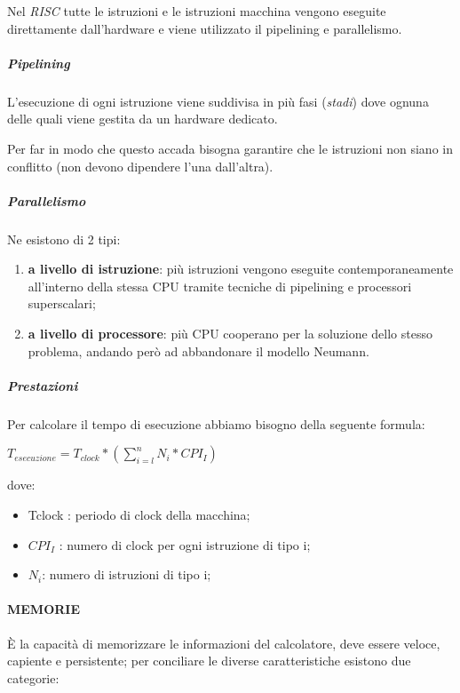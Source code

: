 Nel \emph{RISC} tutte le istruzioni e le istruzioni macchina vengono
eseguite direttamente dall'hardware e viene utilizzato il pipelining e
parallelismo.

\subparagraph{\texorpdfstring{\emph{Pipelining}}{Pipelining}}\label{pipelining}

L'esecuzione di ogni istruzione viene suddivisa in più fasi
(\emph{stadi}) dove ognuna delle quali viene gestita da un hardware
dedicato.

Per far in modo che questo accada bisogna garantire che le istruzioni
non siano in conflitto (non devono dipendere l'una dall'altra).

\subparagraph{\texorpdfstring{\emph{Parallelismo}}{Parallelismo}}\label{parallelismo}

Ne esistono di 2 tipi:

\begin{enumerate}
\def\labelenumi{\arabic{enumi}.}
\item
  \textbf{a livello di istruzione}: più istruzioni vengono eseguite
  contemporaneamente all'interno della stessa CPU tramite tecniche di
  pipelining e processori superscalari;
\item
  \textbf{a livello di processore}: più CPU cooperano per la soluzione
  dello stesso problema, andando però ad abbandonare il modello Neumann.
\end{enumerate}

\subparagraph{\texorpdfstring{\emph{Prestazioni}}{Prestazioni}}\label{prestazioni}

Per calcolare il tempo di esecuzione abbiamo bisogno della seguente
formula:

\(T_{esecuzione} = T_{clock}*(\sum_{i = l}^{n}N_{i}*CPI_{I})\)

dove:

\begin{itemize}
\item
  Tclock : periodo di clock della macchina;
\item
  \(CPI_{I}\) : numero di clock per ogni istruzione di tipo i;
\item
  \(N_{i}\): numero di istruzioni di tipo i;
\end{itemize}

\paragraph{MEMORIE}\label{memorie}

È la capacità di memorizzare le informazioni del calcolatore, deve
essere veloce, capiente e persistente; per conciliare le diverse
caratteristiche esistono due categorie:

